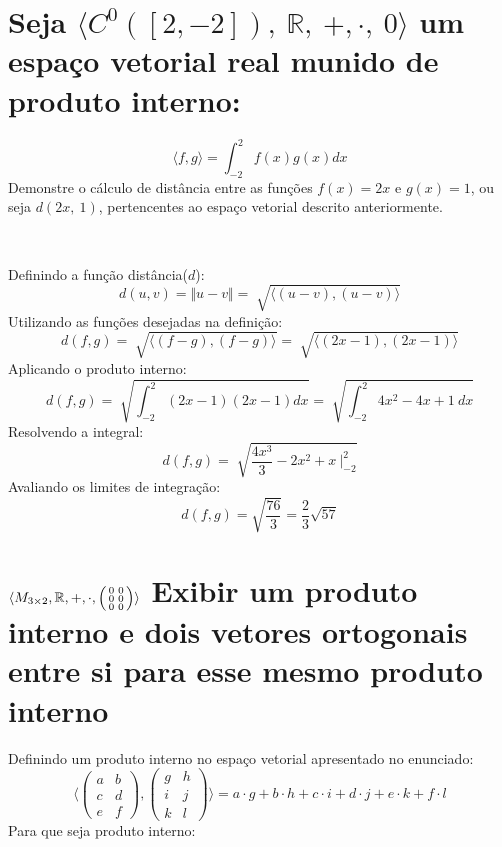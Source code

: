 \documentclass[12pt, twoside, a4]{article} %
\begin{document}
\section{Seja $\langle C^0 ([2,-2]),\ \mathbb{R},\ +, \cdot, \ 0  \rangle $
 um espaço vetorial real munido de produto interno: }
\begin{Large}
        \begin{bf}
        \[ \langle f, g  \rangle = \int_{-2}^{2} f(x)g(x)dx \]  
        Demonstre o cálculo de distância entre as funções $ f(x) = 2x $ e $ g(x) = 1 $,
        ou seja $d(2x,\ 1)$,
        pertencentes ao espaço vetorial descrito anteriormente.  

    \end{bf}
\end{Large}
\

Definindo a função distância($ d $):
    \[ d (u, v) = \Vert u - v \Vert = \sqrt[]{\langle (u - v), (u - v) \rangle} \]
Utilizando as funções desejadas na definição:
    \[ d(f, g) = \sqrt[]{\langle (f - g), (f - g) \rangle} =  \sqrt[]{\langle (2x - 1), (2x - 1) \rangle}\]
Aplicando o produto interno:
    \[ d(f, g) = \sqrt[]{\int_{-2}^{2} (2x - 1)(2x - 1)dx} = \sqrt[]{\int_{-2}^{2} 4x^2 -4x + 1 \ dx} \]
Resolvendo a integral:   
    \[ d(f, g) = \sqrt[]{ \frac{4 x^3}{3} -2x^2 + x \ \Big\vert_{-2}^{2}} \]
Avaliando os limites de integração:
    \[ d(f, g) = \sqrt{ \frac{76}{3} } = \frac{2}{3} \sqrt{57} \]

\section{$\langle M_{3 \times 2}, \mathbb{R}, +, \cdot,
\begin{psmallmatrix} 
 0 & 0 \\
 0 & 0 \\
 0 & 0
\end{psmallmatrix} \rangle 
$ Exibir um produto interno e dois vetores ortogonais entre si para esse mesmo produto interno}

Definindo um produto interno no espaço vetorial apresentado no enunciado:
    \[ \langle \begin{pmatrix} 
        a & b \\
        c & d \\
        e & f
       \end{pmatrix} ,\begin{pmatrix} 
        g & h \\
        i & j \\
        k & l
       \end{pmatrix} \rangle =  a \cdot  g + b \cdot h +
       c \cdot i + d \cdot j +
       e \cdot k + f  \cdot l 
        \]
Para que seja produto interno: 
\end{document}
